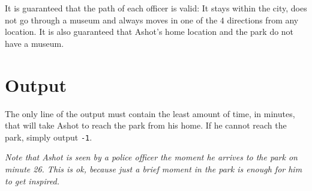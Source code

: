 It is guaranteed that the path of each officer is valid: It stays within the city, does not go through a museum and always moves in one of the $4$ directions from any location.
It is also guaranteed that Ashot's home location and the park do not have a museum.

\section*{Output}
The only line of the output must contain the least amount of time, in minutes, that will take Ashot to reach the park from his home.
If he cannot reach the park, simply output \texttt{-1}.
{
\emph{Note that Ashot is seen by a police officer the moment he arrives to the park on minute 26.
This is ok, because just a brief moment in the park is enough for him to get inspired.}

}
